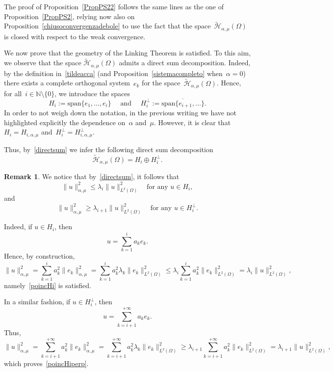 \documentclass[12pt,a4paper,intlimits,sumlimits]{amsart}
\def \N {\mathbb{N}}
\theoremstyle{definition}
\newtheorem{remark}[definition]{Remark}
\theoremstyle{plain}
\numberwithin{equation}{section}
\renewcommand{\leq}{\leqslant}
\renewcommand{\geq}{\geqslant}
\begin{document}
The proof of Proposition~\ref{PropPS22} follows the same lines as the
one of Proposition~\ref{PropPS2}, relying now also on Proposition~\ref{chiusoconvergenzadebole} to use the fact that the space~$\widetilde{\mathcal{H}}_{\alpha, \mu}(\Omega)$
is closed with respect to the weak convergence.

We now prove that the geometry of the Linking Theorem is satisfied.
To this aim, we observe that the space $\widetilde{\mathcal{H}}_{\alpha, \mu}(\Omega)$ admits a direct sum decomposition. Indeed, by the definition in~\eqref{tildeacca} (and Proposition~\ref{sistemacompleto}
when~$\alpha=0$) there exists a complete orthogonal system~$e_k$ for the space~$\widetilde{\mathcal{H}}_{\alpha, \mu}(\Omega)$.
Hence, for all~$i\in\N\setminus\{0\}$, we introduce the spaces
\begin{equation}\label{directsum}
H_i:= \mbox{span}\{e_1,\dots, e_i\}\quad\mbox{ and }\quad H^{\perp}_i:= \overline{\mbox{span}\{e_{i+1},\dots\}}.
\end{equation}
In order to not weigh down the notation,  in the previous writing we have not highlighted explicitly the dependence on~$\alpha$ and~$\mu$. However, it is clear that~$H_i=H_{i, \alpha, \mu}$ and~$H^\perp_i=H^\perp_{i, \alpha, \mu}$.

Thus, by~\eqref{directsum} we infer the following direct sum decomposition
\[
\widetilde{\mathcal{H}}_{\alpha, \mu}(\Omega) = H_i \oplus  H^{\perp}_i.
\]
\begin{remark}
We notice that by~\eqref{directsum}, it follows that
\begin{equation}\label{poincHi}
\|u\|_{\alpha,\mu}^2\leq \lambda_i\|u\|_{L^2(\Omega)}^2
\quad \mbox{for any } u\in H_i,
\end{equation}
and
\begin{equation}\label{poincHiperp}
\|u\|_{\alpha,\mu}^2\geq \lambda_{i+1}\|u\|_{L^2(\Omega)}^2
\quad \mbox{for any } u\in H_i^\perp.
\end{equation}

Indeed, if $u\in H_i$, then 
\[
u=\sum_{k=1}^ia_ke_k.
\]
Hence, by construction,
\[
\|u\|_{\alpha,\mu}^2=
\sum_{k=1}^ia_k^2\|e_k\|_{\alpha,\mu}^2
=\sum_{k=1}^ia_k^2\lambda_k\|e_k\|_{L^2(\Omega)}^2 \leq \lambda_i\sum_{k=1}^ia_k^2\|e_k\|_{L^2(\Omega)}^2
=\lambda_i\|u\|_{L^2(\Omega)}^2,
\]
namely~\eqref{poincHi} is satisfied.

In a similar fashion, if $u\in H_i^\perp$, then
\[
u=\sum_{k=i+1}^{+\infty}a_ke_k.
\]
Thus,
\[
\|u\|_{\alpha,\mu}^2=
\sum_{k=i+1}^{+\infty}a_k^2\|e_k\|_{\alpha,\mu}^2
=\sum_{k=i+1}^{+\infty}a_k^2\lambda_k\|e_k\|_{L^2(\Omega)}^2 
\geq \lambda_{i+1}\sum_{k=i+1}^{+\infty}a_k^2\|e_k\|_{L^2(\Omega)}^2
=\lambda_{i+1}\|u\|_{L^2(\Omega)}^2,
\]
which proves~\eqref{poincHiperp}.
\end{remark}
\end{document}
